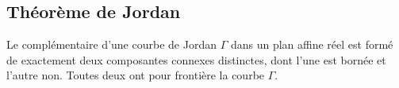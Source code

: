 \subsection{Théorème de Jordan}

\begin{theorem}\label{ThoHSPWBuh}
	Le complémentaire d'une courbe de Jordan \( \Gamma\) dans un plan affine réel est formé de exactement deux composantes connexes distinctes, dont l'une est bornée et l'autre non. Toutes deux ont pour frontière la courbe \( \Gamma\).
\end{theorem}
